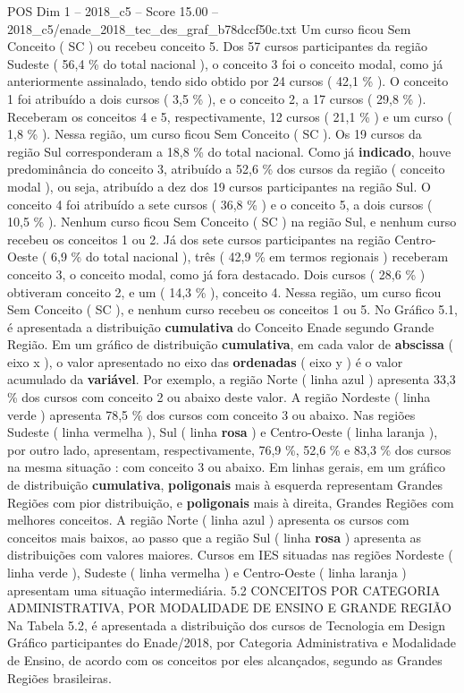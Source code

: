 \begin{textsample}{POS Dim 1 – 2018\_c5 – Score 15.00 – 2018\_c5/enade\_2018\_tec\_des\_graf\_b78dccf50c.txt}
Um curso ficou Sem Conceito ( SC ) ou recebeu conceito 5.
Dos 57 cursos participantes da região Sudeste ( 56,4 \% do total nacional ), o conceito 3 foi o conceito modal, como já anteriormente assinalado, tendo sido obtido por 24 cursos ( 42,1 \% ).
O conceito 1 foi atribuído a dois cursos ( 3,5 \% ), e o conceito 2, a 17 cursos ( 29,8 \% ).
Receberam os conceitos 4 e 5, respectivamente, 12 cursos ( 21,1 \% ) e um curso ( 1,8 \% ).
Nessa região, um curso ficou Sem Conceito ( SC ).
Os 19 cursos da região Sul corresponderam a 18,8 \% do total nacional.
Como já \textbf{indicado}, houve predominância do conceito 3, atribuído a 52,6 \% dos cursos da região ( conceito modal ), ou seja, atribuído a dez dos 19 cursos participantes na região Sul.
O conceito 4 foi atribuído a sete cursos ( 36,8 \% ) e o conceito 5, a dois cursos ( 10,5 \% ).
Nenhum curso ficou Sem Conceito ( SC ) na região Sul, e nenhum curso recebeu os conceitos 1 ou 2.
Já dos sete cursos participantes na região Centro-Oeste ( 6,9 \% do total nacional ), três ( 42,9 \% em termos regionais ) receberam conceito 3, o conceito modal, como já fora destacado.
Dois cursos ( 28,6 \% ) obtiveram conceito 2, e um ( 14,3 \% ), conceito 4.
Nessa região, um curso ficou Sem Conceito ( SC ), e nenhum curso recebeu os conceitos 1 ou 5.
No Gráfico 5.1, é apresentada a distribuição \textbf{cumulativa} do Conceito Enade segundo Grande Região.
Em um gráfico de distribuição \textbf{cumulativa}, em cada valor de \textbf{abscissa} ( eixo x ), o valor apresentado no eixo das \textbf{ordenadas} ( eixo y ) é o valor acumulado da \textbf{variável}.
Por exemplo, a região Norte ( linha azul ) apresenta 33,3 \% dos cursos com conceito 2 ou abaixo deste valor.
A região Nordeste ( linha verde ) apresenta 78,5 \% dos cursos com conceito 3 ou abaixo.
Nas regiões Sudeste ( linha vermelha ), Sul ( linha \textbf{rosa} ) e Centro-Oeste ( linha laranja ), por outro lado, apresentam, respectivamente, 76,9 \%, 52,6 \% e 83,3 \% dos cursos na mesma situação : com conceito 3 ou abaixo.
Em linhas gerais, em um gráfico de distribuição \textbf{cumulativa}, \textbf{poligonais} mais à esquerda representam Grandes Regiões com pior distribuição, e \textbf{poligonais} mais à direita, Grandes Regiões com melhores conceitos.
A região Norte ( linha azul ) apresenta os cursos com conceitos mais baixos, ao passo que a região Sul ( linha \textbf{rosa} ) apresenta as distribuições com valores maiores.
Cursos em IES situadas nas regiões Nordeste ( linha verde ), Sudeste ( linha vermelha ) e Centro-Oeste ( linha laranja ) apresentam uma situação intermediária. 5.2 CONCEITOS POR CATEGORIA ADMINISTRATIVA, POR MODALIDADE DE ENSINO E GRANDE REGIÃO Na Tabela 5.2, é apresentada a distribuição dos cursos de Tecnologia em Design Gráfico participantes do Enade/2018, por Categoria Administrativa e Modalidade de Ensino, de acordo com os conceitos por eles alcançados, segundo as Grandes Regiões brasileiras.

\end{textsample}
